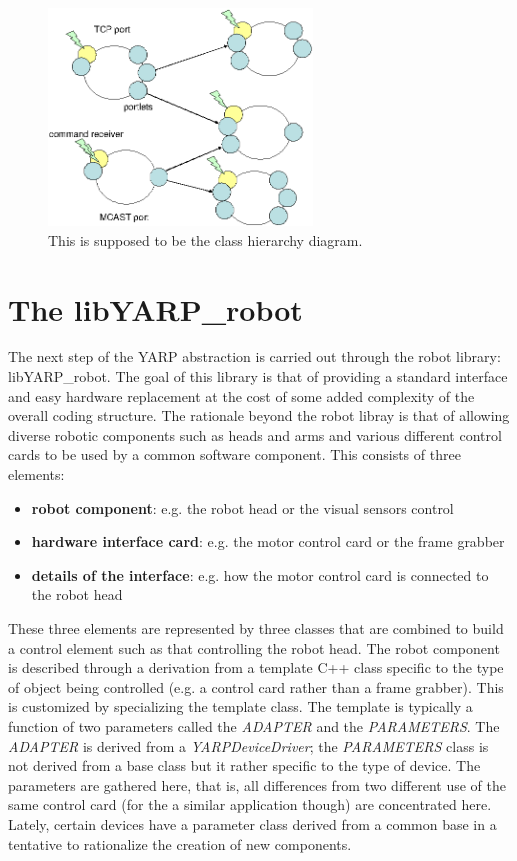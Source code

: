 \begin{figure}[tb]
\centerline{
\includegraphics[width=7cm]{fig-port-portlets}
}
\caption[Interprocess communication model]{ 
%
This is supposed to be the class hierarchy diagram.
%
}
\label{fig:yarp-port}
\end{figure}



\section{The libYARP\_robot}
The next step of the YARP abstraction is carried out through the robot library: libYARP\_robot. The goal of this library is that of providing a standard interface and easy hardware replacement at the cost of some added complexity of the overall coding structure. The rationale beyond the robot libray is that of allowing diverse robotic components such as heads and arms and various different control cards to be used by a common software component. This consists of three elements:

\begin{itemize}
\item {\bf robot component}: e.g. the robot head or the visual sensors control
\item {\bf hardware interface card}: e.g. the motor control card or the frame grabber
\item {\bf details of the interface}: e.g. how the motor control card is connected to the robot head
\end{itemize}

These three elements are represented by three classes that are combined to build a control element such as that controlling the robot head. The robot component is described through a derivation from a template C++ class specific to the type of object being controlled (e.g. a control card rather than a frame grabber). This is customized by specializing the template class. The template is typically a function of two parameters called the {\em ADAPTER} and the {\em PARAMETERS}. The {\em ADAPTER} is derived from a {\em YARPDeviceDriver}; the {\em PARAMETERS} class is not derived from a base class but it rather specific to the type of device. The parameters are gathered here, that is, all differences from two different use of the same control card (for the a similar application though) are concentrated here. Lately, certain devices have a parameter class derived from a common base in a tentative to rationalize the creation of new components. 

